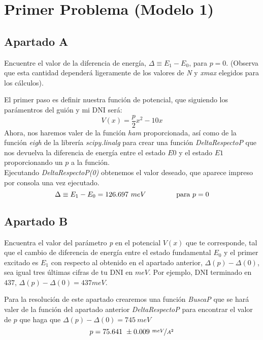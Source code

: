 \documentclass[11pt]{article}
\newcommand{\laputa}[1]{\begin{note}{#1}{}\end{note}}
\begin{document}
\section{Primer Problema (Modelo 1)}
    
    \subsection{Apartado A}
    \laputa{Encuentre el valor de la diferencia de energía, $\Delta \equiv E_1 - E_0$, para $p = 0$. (Observa que esta cantidad dependerá ligeramente de los valores de \textit{N} y \textit{xmax} elegidos para los cálculos).}

        \noindent El primer paso es definir nuestra función de potencial, que siguiendo los parámentros del guión y mi DNI será:
        \begin{equation}
            V(x)=\dfrac{p}{2}x^2-10x
        \end{equation}
        \noindent Ahora, nos haremos valer de la función \textit{ham} proporcionada, así como de la función \textit{eigh} de la librería \textit{scipy.linalg} para crear una función \textit{DeltaRespectoP} que nos devuelva la diferencia de energía entre el estado $E0$ y el estado $E1$ proporcionando un $p$ a la función.\\
    
        \noindent Ejecutando \textit{DeltaRespectoP(0)} obtenemos el valor deseado, que aparece impreso por consola una vez ejecutado.    
        \begin{equation}
            \Delta \equiv E_1 - E_0 = 126.697\ meV \hspace{1.5cm}\text{para }p=0
        \end{equation}

    \subsection{Apartado B}
    \laputa{Encuentra el valor del parámetro \textit{p} en el potencial $V(x)$ que te corresponde, tal que el cambio de diferencia de energía entre el estado fundamental $E_0$ y el primer excitado es $E_1$ con respecto al obtenido en el apartado anterior, $\Delta(p) - \Delta(0)$, sea igual tres últimas cifras de tu DNI en $meV$. Por ejemplo, DNI terminado en $437$, $\Delta(p) - \Delta(0)=437meV$.}

        \noindent Para la resolución de este apartado crearemos una función \textit{BuscaP} que se hará valer de la función del apartado anterior \textit{DeltaRespectoP} para encontrar el valor de $p$ que haga que $\Delta(p) - \Delta(0)= 745\ meV$\\
        \begin{equation}
            p = 75.641\ \pm 0.009\ \nicefrac{meV}{A^2}
        \end{equation}
        
\end{document}
